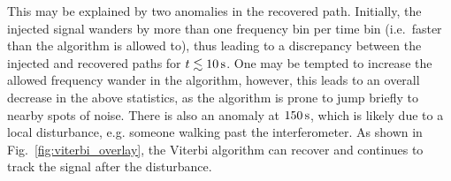 \documentclass[paper-main.tex]{subfiles}
\begin{document}
This may be explained by two anomalies in the recovered path. Initially, the injected signal wanders by more than one frequency bin per time bin (i.e.\ faster than the algorithm is allowed to), thus leading to a discrepancy between the injected and recovered paths for $t\lesssim 10\,{\rm s}$. One may be tempted to increase the allowed frequency wander in the algorithm, however, this leads to an overall decrease in the above statistics, as the algorithm is prone to jump briefly to nearby spots of noise. There is also an anomaly at $150\,{\rm s}$, which is likely due to a local disturbance, e.g. someone walking past the interferometer. 
As shown in Fig.~\ref{fig:viterbi_overlay}, the Viterbi algorithm can recover and continues to track the signal after the disturbance. 
\end{document}
